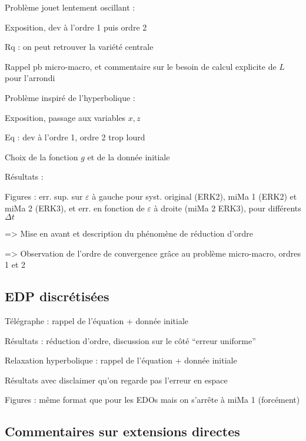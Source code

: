 Problème jouet lentement oscillant :

Exposition, dev à l’ordre 1 puis ordre 2

Rq : on peut retrouver la variété centrale

Rappel pb micro-macro, et commentaire sur le besoin de calcul explicite de $L$ pour l’arrondi

Problème inspiré de l’hyperbolique :

Exposition, passage aux variables $x, z$

Eq : dev à l’ordre 1, ordre 2 trop lourd

Choix de la fonction $g$ et de la donnée initiale

Résultats :

Figures : err. sup. sur $\varepsilon$ à gauche pour syst. original (ERK2), miMa 1 (ERK2) et miMa 2 (ERK3), et err. en fonction de $\varepsilon$ à droite (miMa 2 ERK3), pour différents $\Delta t$

=> Mise en avant et description du phénomène de réduction d’ordre

=> Observation de l’ordre de convergence grâce au problème micro-macro, ordres 1 et 2



\subsection{EDP discrétisées}

Télégraphe : rappel de l’équation + donnée initiale

Résultats : réduction d’ordre, discussion sur le côté “erreur uniforme”

Relaxation hyperbolique : rappel de l’équation + donnée initiale

Résultats avec disclaimer qu’on regarde pas l’erreur en espace

Figures : même format que pour les EDOs mais on s’arrête à miMa 1
(forcément)


\subsection{Commentaires sur extensions directes}

